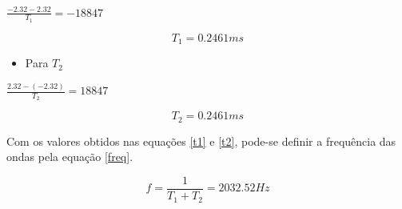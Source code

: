 \begin{center}
    $\frac{-2.32 - 2.32}{T_1} = - 18847$
\end{center}

\begin{center}
    \begin{equation} \label{t1}
    T_1 = 0.2461 ms
    \end{equation}
\end{center}

\begin{itemize}
    \item Para $T_2$\\
\end{itemize}

\begin{center}
    $\frac{2.32 - (-2.32)}{T_2} =  18847$
\end{center}

\begin{center}
    \begin{equation} \label{t2}
    T_2 = 0.2461 ms
    \end{equation}
\end{center}


Com os valores obtidos nas equações \ref{t1} e \ref{t2}, pode-se definir a frequência das ondas pela equação \ref{freq}.

\begin{center}
    \begin{equation} \label{freq}
    f = \frac{1}{T_1 + T_2} = 2032.52 Hz
    \end{equation}
\end{center}
